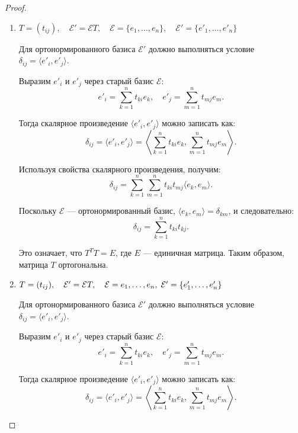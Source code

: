 \begin{proof}
    \leavevmode \nl  
    
    \begin{enumerate}
        \item  $ T = (t_{ij}), \quad \mathcal{E'} = \mathcal{E}T , \quad \mathcal{E} = \{e_{1}, \ldots, e_{n} \}, \quad \mathcal{E'} = \{e'_{1}, \ldots, e'_{n} \}$
        \nl 
        
        \quad Для ортонормированного базиса \( \mathcal{E}' \) должно выполняться условие \( \delta_{ij} = \langle e'_i, e'_j \rangle \).
        \nl
        
        \quad Выразим \( e'_i \) и \( e'_j \) через старый базис \( \mathcal{E} \):
        \[
        e'_i = \sum_{k=1}^n t_{ki} e_k, \quad e'_j = \sum_{m=1}^n t_{mj} e_m.
        \]
        \nl
        
        \quad Тогда скалярное произведение \( \langle e'_i, e'_j \rangle \) можно записать как:
        \[
        \delta_{ij} = \langle e'_i, e'_j \rangle = \left\langle \sum_{k=1}^n t_{ki} e_k, \sum_{m=1}^n t_{mj} e_m \right\rangle.
        \]
        \nl
        
        \quad Используя свойства скалярного произведения, получим:
        \[
        \delta_{ij} = \sum_{k=1}^n \sum_{m=1}^n t_{ki} t_{mj} \langle e_k, e_m \rangle.
        \]
        \nl
        
        \quad Поскольку \( \mathcal{E} \) — ортонормированный базис, \( \langle e_k, e_m \rangle = \delta_{km} \), и следовательно:
        \[
        \delta_{ij} = \sum_{k=1}^n t_{ki} t_{kj}.
        \]
        \nl
        
        \quad Это означает, что \( T^T T = E \), где \( E \) — единичная матрица. Таким образом, матрица \( T \) ортогональна.
        \nl 
    
        \item $ T = (t_{ij}), \quad \mathcal{E'} = \mathcal{E} T, \quad \mathcal{E} = {e_{1}, \ldots, e_{n}}, \; \mathcal{E'} = \{e'_{1}, \ldots, e'_{n}\} $
        \nl
        
        \quad Для ортонормированного базиса \( \mathcal{E}' \) должно выполняться условие \( \delta_{ij} = \langle e'_i, e'_j \rangle \).
        \nl
        
        \quad Выразим \( e'_i \) и \( e'_j \) через старый базис \( \mathcal{E} \):
        \[
        e'_i = \sum_{k=1}^n t_{ki} e_k, \quad e'_j = \sum_{m=1}^n t_{mj} e_m.
        \]
        \nl
        
        \quad Тогда скалярное произведение \( \langle e'_i, e'_j \rangle \) можно записать как:
        \[
        \delta_{ij} = \langle e'_i, e'_j \rangle = \left\langle \sum_{k=1}^n t_{ki} e_k, \sum_{m=1}^n t_{mj} e_m \right\rangle.
        \]
        \nl
        

\end{enumerate}
\end{proof}
